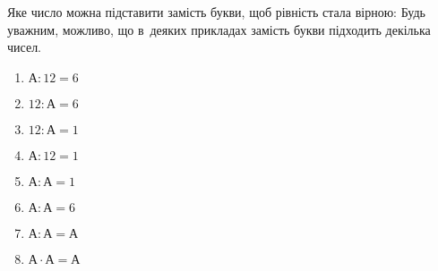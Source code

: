 \problem
Яке число можна підставити замість букви, щоб рівність стала вірною:
Будь уважним, можливо, що в~деяких прикладах замість букви підходить декілька чисел.
\begin{multicols}{2}
    \begin{enumerate}
        \item $А : 12 = 6$
        \item $12 : А = 6$
        \item $12 : А = 1$
        \item $А : 12 = 1$
        \item $А : А = 1$
        \item $А : А = 6$
        \item $А : А = А$
        \item $А \cdot А = А$
    \end{enumerate}
\end{multicols}
